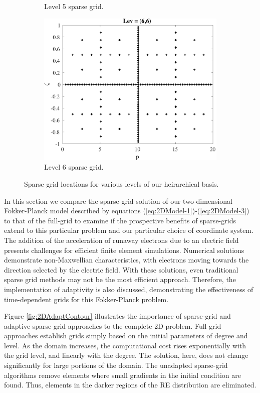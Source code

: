 \documentclass[preprint,11pt]{elsarticle}
\begin{document}
\begin{figure}
\begin{subfigure}{0.32\textwidth}
		\caption{Level 5 sparse grid.} %
	\end{subfigure}
	\vspace{0.5em} %
	\begin{subfigure}{0.32\textwidth} %
		\includegraphics[width=\textwidth]{FIGURES/asgard-sg-lev6.pdf}
		\caption{Level 6 sparse grid.} %
	\end{subfigure}
	\caption{Sparse grid locations for various levels of our heirarchical basis.} %
\end{figure}
%

In this section we compare the sparse-grid solution of our two-dimensional Fokker-Planck model described by equations (\ref{eq:2DModel-1})-(\ref{eq:2DModel-3}) to that of the full-grid to examine if the prospective benefits of sparse-grids extend to this particular problem and our particular choice of coordinate system. The addition of the acceleration of runaway electrons due to an electric field presents challenges for efficient finite element simulations. Numerical solutions demonstrate non-Maxwellian characteristics, with electrons moving towards the direction selected by the electric field. With these solutions, even traditional sparse grid methods may not be the most efficient approach. Therefore, the implementation of adaptivity is also discussed, demonstrating the effectiveness of time-dependent grids for this Fokker-Planck problem. 

Figure \ref{fig:2DAdaptContour} illustrates the importance of sparse-grid and adaptive sparse-grid approaches to the complete 2D problem. Full-grid approaches establish grids simply based on the initial parameters of degree and level. As the domain increases, the computational cost rises exponentially with the grid level, and linearly with the degree. The solution, here, does not change significantly for large portions of the domain. The unadapted sparse-grid algorithms remove elements where small gradients in the initial condition are found. Thus, elements in the darker regions of the RE distribution are eliminated. 
\end{document}
